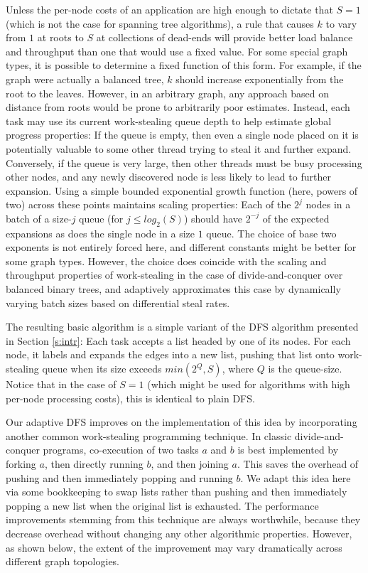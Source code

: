 Unless the per-node costs of an application are high enough to dictate
that $S=1$ (which is not the case for spanning tree algorithms), a rule
that causes $k$ to vary from $1$ at roots to $S$ at collections of dead-ends
will provide better load balance and throughput than one that would use a
fixed value. For some special graph types, it is possible to determine
a fixed function of this form. For example, if the graph were actually
a balanced tree, $k$ should increase exponentially from the root to the
leaves. However, in an arbitrary graph, any approach based on distance
from roots would be prone to arbitrarily poor estimates.  Instead, each
task may use its current work-stealing queue depth to help estimate
global progress properties: If the queue is empty, then even a single
node placed on it is potentially valuable to some other thread trying
to steal it and further expand.  Conversely, if the queue is very
large, then other threads must be busy processing other nodes, and any
newly discovered node is less likely to lead to further expansion.
Using a simple bounded exponential growth function (here, powers of
two) across these points maintains scaling properties: Each of the 
$2^j$ nodes in a batch of a size-$j$ queue (for $j \leq log_2(S)$) should have
$2^{-j}$ of the expected expansions as does the single node in a size $1$
queue. The choice of base two exponents is not entirely forced here,
and different constants might be better for some graph types.
However, the choice does coincide with the scaling and throughput
properties of work-stealing in the case of divide-and-conquer over
balanced binary trees, and adaptively approximates this case by
dynamically varying batch sizes based on differential steal rates.

The resulting basic algorithm is a simple variant of the DFS algorithm
presented in Section \ref{s:intr}: Each task accepts a list headed by one of its
nodes.  For each node, it labels and expands the edges into a new
list, pushing that list onto work-stealing queue when its size
exceeds $min(2^{Q}, S)$, where $Q$ is the queue-size. Notice that in
the case of $S=1$ (which might be used for algorithms with high
per-node processing costs), this is identical to plain DFS.

Our adaptive DFS improves on the implementation of this idea by
incorporating another common work-stealing programming technique. In
classic divide-and-conquer programs, co-execution of two tasks $a$ and $b$
is best implemented by forking $a$, then directly running $b$, and then
joining $a$.  This saves the overhead of pushing and then immediately
popping and running $b$.  We adapt this idea here via some bookkeeping
to swap lists rather than pushing and then immediately popping a new
list when the original list is exhausted. The performance improvements
stemming from this technique are always worthwhile, because they
decrease overhead without changing any other algorithmic
properties. However, as shown below, the extent of the improvement may
vary dramatically across different graph topologies.

